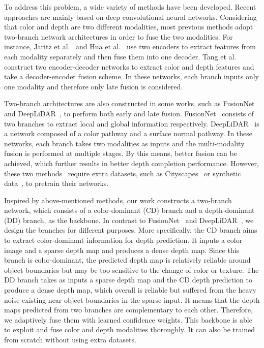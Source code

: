 \documentclass[letterpaper, 10 pt, conference]{ieeeconf}
\begin{document}
To address this problem, a wide variety of methods have been developed. Recent approaches are mainly based on deep convolutional neural networks. Considering that color and depth are two different modalities, most previous methods adopt two-branch network architectures in order to fuse the two modalities. For instance, Jaritz et al.~\cite{Jaritz2018semantic} and Hua et al.~\cite{Hua2018normalized} use two encoders to extract features from each modality separately and then fuse them into one decoder. Tang et al.~\cite{Tang2019guided} construct two encoder-decoder networks to extract color and depth features and take a decoder-encoder fusion scheme. In these networks, each branch inputs only one modality and therefore only late fusion is considered. 

Two-branch architectures are also constructed in some works, such as FusionNet~\cite{Gansbeke2019} and DeepLiDAR~\cite{Qiu2019deeplidar}, to perform both early and late fusion. FusionNet~\cite{Gansbeke2019} consists of two branches to extract local and global information respectively. DeepLiDAR~\cite{Qiu2019deeplidar} is a network composed of a color pathway and a surface normal pathway. In these networks, each branch takes two modalities as inputs and the multi-modality fusion is performed at multiple stages. By this means, better fusion can be achieved, which further results in better depth completion performance. However, these two methods~\cite{Gansbeke2019,Qiu2019deeplidar} require extra datasets, such as Cityscapes~\cite{Cordts2016} or synthetic data~\cite{Qiu2019deeplidar}, to pretrain their networks.







Inspired by above-mentioned methods, our work constructs a two-branch network, which consists of a color-dominant (CD) branch and a depth-dominant (DD) branch, as the backbone. In contrast to FusionNet~\cite{Gansbeke2019} and DeepLiDAR~\cite{Qiu2019deeplidar}, we design the branches for different purposes. More specifically, the CD branch aims to extract color-dominant information for depth prediction. It inputs a color image and a sparse depth map and produces a dense depth map. Since this branch is color-dominant, the predicted depth map is relatively reliable around object boundaries but may be too sensitive to the change of color or texture. The DD branch takes as inputs a sparse depth map and the CD depth prediction to produce a dense depth map, which overall is reliable but suffered from the heavy noise existing near object boundaries in the sparse input. It means that the depth maps predicted from two branches are complementary to each other. Therefore, we adaptively fuse them with learned confidence weights. This backbone is able to exploit and fuse color and depth modalities thoroughly. It can also be trained from scratch without using extra datasets.  
\end{document}
